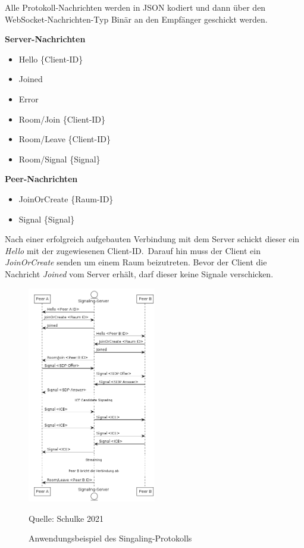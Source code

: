 \documentclass{article}
\newcommand{\figuresource}[1]{
	\begin{center}Quelle: #1\end{center}
}
\begin{document}
\begin{onecolumn}
Alle Protokoll-Nachrichten werden in JSON kodiert und dann über den
WebSocket-Nachrichten-Typ Binär an den Empfänger geschickt werden.

\vspace{0.5em}

\textbf{Server-Nachrichten}

\begin{itemize}
	\item Hello \{Client-ID\}
	\item Joined
	\item Error
	\item Room/Join \{Client-ID\}
	\item Room/Leave \{Client-ID\}
	\item Room/Signal \{Signal\}
\end{itemize}

\vspace{0.5em}

\textbf{Peer-Nachrichten}

\begin{itemize}
	\item JoinOrCreate \{Raum-ID\}
	\item Signal \{Signal\}
\end{itemize}

\vspace{0.5em}

Nach einer erfolgreich aufgebauten Verbindung mit dem Server schickt dieser ein
\textit{Hello} mit der zugewiesenen Client-ID.\ Darauf hin muss der Client ein
\textit{JoinOrCreate} senden um einem Raum beizutreten. Bevor der Client die
Nachricht \textit{Joined} vom Server erhält, darf dieser keine Signale
verschicken.

\begin{figure}[ht]
	\includegraphics[width=0.5\textwidth]{signaling-protocol}
	\centering
	\caption{Anwendungsbeispiel des Singaling-Protokolls}
	\figuresource{Schulke 2021}
\end{figure}


\end{onecolumn}
\end{document}
